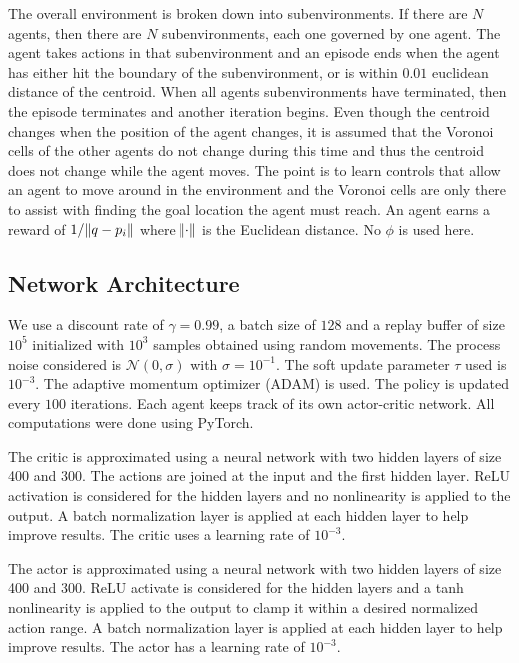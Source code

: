 \documentclass[10pt,conference]{IEEEtran}
\begin{document}
The overall environment is broken down into subenvironments. If there are $N$ agents, then there are $N$ subenvironments, each one governed by one agent. The agent takes actions in that subenvironment and an episode ends when the agent has either hit the boundary of the subenvironment, or is within $0.01$ euclidean distance of the centroid. When all agents subenvironments have terminated, then the episode terminates and another iteration begins. Even though the centroid changes when the position of the agent changes, it is assumed that the Voronoi cells of the other agents do not change during this time and thus the centroid does not change while the agent moves. The point is to learn controls that allow an agent to move around in the environment and the Voronoi cells are only there to assist with finding the goal location the agent must reach. An agent earns a reward of $1 / \norm{q - p_i}$ where $\norm{\cdot}$ is the Euclidean distance. No $\phi$ is used here. 
\subsection{Network Architecture}
We use a discount rate of $\gamma = 0.99$, a batch size of $128$ and a replay buffer of size $10^5$ initialized with $10^3$ samples obtained using random movements. The process noise considered is $\mathcal{N}(0, \sigma)$ with $\sigma = 10^{-1}$. The soft update parameter $\tau$ used is $10^{-3}$. The adaptive momentum optimizer (ADAM) is used. The policy is updated every $100$ iterations. Each agent keeps track of its own actor-critic network. All computations were done using PyTorch.

The critic is approximated using a neural network with two hidden layers of size 400 and 300. The actions are joined at the input and the first hidden layer. ReLU activation is considered for the hidden layers and no nonlinearity is applied to the output. A batch normalization layer is applied at each hidden layer to help improve results. The critic uses a learning rate of $10^{-3}$.

The actor is approximated using a neural network with two hidden layers of size 400 and 300. ReLU activate is considered for the hidden layers and a tanh nonlinearity is applied to the output to clamp it within a desired normalized action range. A batch normalization layer is applied at each hidden layer to help improve results. The actor has a learning rate of $10^{-3}$.
\end{document}
